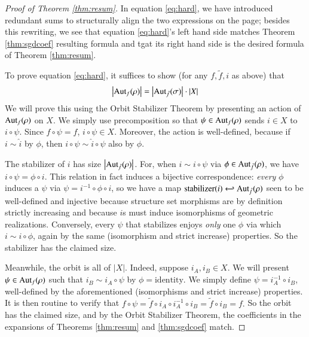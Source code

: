 \documentclass{article}
\theoremstyle{plain}
\theoremstyle{definition}
\newcommand{\wabs}[1]{\left|#1\right|}
\newcommand{\Aut}{\text{\textnormal{Aut}}}
\begin{document}
\begin{proof}[Proof of Theorem \ref{thm:resum}]
            In equation \ref{eq:hard}, we have introduced
            redundant sums to structurally align the two expressions on the
            page; besides this rewriting, we see that equation \ref{eq:hard}'s
            left hand side matches Theorem \ref{thm:sgdcoef} resulting formula
            and tgat its right hand side is the desired formula of Theorem
            \ref{thm:resum}. 

            To prove equation \ref{eq:hard}, it suffices to show (for any
            $f, \tilde f, i$ as above) that
            $$
                \wabs{\Aut_f(\rho)}
                =
                \wabs{\Aut_{\tilde f}(\sigma)}
                \cdot
                \wabs{X}
            $$
            We will prove this using the Orbit Stabilizer Theorem by presenting
            an action of $\Aut_f(\rho)$ on $X$.  We simply use precomposition
            so that $\psi\in \Aut_f(\rho)$ sends $i\in X$ to $i\circ \psi$.
            Since $f\circ\psi = f$, $i\circ \psi \in X$.  Moreover, the action
            is well-defined, because if $i\sim \hat i$ by $\phi$, then $i \circ
            \psi \sim \hat i \circ \psi$ also by $\phi$.
            
            The stabilizer of $i$ has size $\wabs{\Aut_{\tilde f}(\rho)}$.
            For, when $i \sim i \circ \psi$ via $\phi \in \Aut_{\tilde
            f}(\rho)$, we have $i\circ \psi = \phi \circ i$.  This relation in
            fact induces a bijective correspondence: \emph{every} $\phi$
            induces a $\psi$ via $\psi = i^{-1} \circ \phi \circ i$, so we have
            a map $\text{stabilizer}(i) \hookleftarrow \Aut_{\tilde f}(\rho)$
            seen to be well-defined and injective because structure set
            morphisms are by definition strictly increasing and because $i$s
            must induce isomorphisms of geometric realizations.  Conversely,
            every $\psi$ that stabilizes enjoys \emph{only} one $\phi$ via
            which $i \sim i \circ \phi$, again by the same (isomorphism and
            strict increase) properties.  So the stabilizer has the claimed
            size.

            Meanwhile, the orbit is all of $\wabs{X}$.  Indeed, suppose $i_A,
            i_B \in X$.  We will present $\psi \in \Aut_f(\rho)$ such that $i_B
            \sim i_A \circ \psi$ by $\phi=\text{identity}$.  We simply define
            $\psi = i_A^{-1} \circ i_B$, well-defined by the aforementioned
            (isomorphisms and strict increase) properties.  It is then routine
            to verify that
            $
                f \circ \psi
                =
                \tilde f \circ i_A \circ i_A^{-1} \circ i_B
                =
                \tilde f \circ i_B
                = f.
            $
            So the orbit has the claimed size, and by the Orbit Stabilizer
            Theorem, the coefficients in the expansions of Theorems 
            \ref{thm:resum} and \ref{thm:sgdcoef} match.
        \end{proof}
\end{document}
